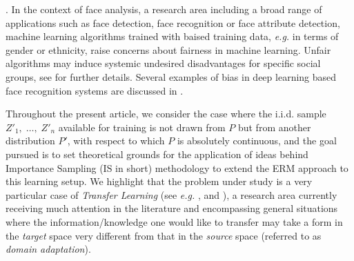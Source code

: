 \documentclass[12pt]{article}
\begin{document}
\cite{huang2007correcting}. In the context of face analysis, a research area
including a broad range of applications such as face detection, face
recognition or face attribute detection, machine learning algorithms trained
with baised training data, \textit{e.g.} in terms of gender or ethnicity, raise concerns
about fairness in machine learning. Unfair algorithms may induce systemic undesired
disadvantages for specific social groups,
see \cite{das2018mitigating} for further details. Several
examples of bias in deep learning based face recognition systems are discussed
in \cite{nagpal2019deep}.


Throughout the present article, we consider the case where the i.i.d. sample $Z'_1,\;\ldots,\; Z'_n$ available for training is not drawn from $P$ but from another distribution $P'$, with respect to which $P$ is absolutely continuous, and the goal pursued is to set theoretical grounds for the application of ideas behind Importance Sampling (IS in short) methodology to extend the ERM approach to this learning setup. We highlight that the problem under study is a very particular case of \textit{Transfer Learning} (see \textit{e.g.} \cite{5288526}, \cite{BenDavid10} and \cite{storkey2009training}), a research area currently receiving much attention in the literature and encompassing general situations where the information/knowledge one would like to transfer may take a form in the \textit{target} space very different from that in the \textit{source} space (referred to as \textit{domain adaptation}).
\end{document}
